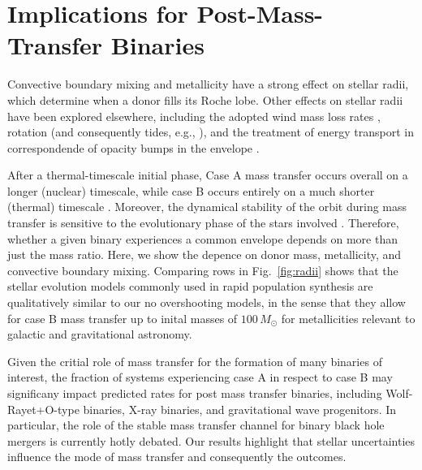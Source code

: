 \documentclass[twocolumn]{aastex63}
\DeclareRobustCommand{\Figref}[1]{Fig.~\ref{#1}}
\begin{document}
\section{Implications for Post-Mass-Transfer Binaries}

Convective boundary mixing \citep{brott:11, johnston:24} and
metallicity have a strong effect on stellar radii, which determine
when a donor fills its Roche lobe. Other effects on stellar radii have
been explored elsewhere, including the adopted wind mass loss rates
\citep[e.g.,][]{smith:14, renzo:17, josiek:24}, rotation (and
consequently tides, e.g., \citealt{maeder:00}), and the treatment of energy transport
in correspondende of opacity bumps in the envelope
\citep[e.g.,][]{joss:73, agrawal:22, cheng:24}.

After a thermal-timescale initial phase, Case A mass transfer occurs
overall on a longer (nuclear) timescale, while case B occurs entirely
on a much shorter (thermal) timescale \citep[but see][]{klencki:22}.
Moreover, the dynamical stability of the orbit during mass transfer is
sensitive to the evolutionary phase of the stars involved
\citep[e.g.,][]{claeys:14}. Therefore, whether a given binary
experiences a common envelope depends on more than just the mass
ratio. Here, we show the depence on donor mass, metallicity, and
convective boundary mixing. Comparing rows in \Figref{fig:radii} shows
that the stellar evolution models commonly used in rapid population
synthesis are qualitatively similar to our no overshooting models, in
the sense that they allow for case B mass transfer up to inital masses
of $100 \, M_{\odot}$ for metallicities relevant to galactic and
gravitational astronomy.

Given the critial role of mass transfer for the formation of many
binaries of interest, the fraction of systems experiencing case A in
respect to case B may significany impact predicted rates for post mass
transfer binaries, including Wolf-Rayet+O-type binaries, X-ray
binaries, and gravitational wave progenitors. In particular, the role
of the stable mass transfer channel \citep[e.g.,][]{marchant:21,
  vanson:22} for binary black hole mergers is currently hotly debated.
Our results highlight that stellar uncertainties influence the mode of
mass transfer and consequently the outcomes.




\end{document}
